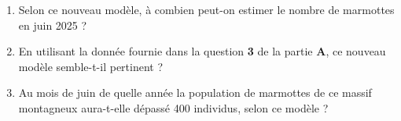 \begin{enumerate}
		\begin{enumerate}
			\item Selon ce nouveau modèle, à combien peut-on estimer le nombre de marmottes en juin 2025 ?
			
			\item En utilisant la donnée fournie dans la question \textbf{3} de la partie \textbf{A}, ce nouveau modèle semble-t-il pertinent ?
			
			\item Au mois de juin de quelle année la population de marmottes de ce massif montagneux aura-t-elle dépassé 400 individus, selon ce modèle ?
		\end{enumerate}
	\end{enumerate}
